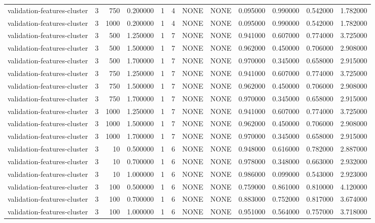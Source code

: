\begin{tabular}{lrrrllllrrrr}
validation-features-cluster & 3 & 750 & 0.200000 & 1 & 4 & NONE & NONE & 0.095000 & 0.990000 & 0.542000 & 1.782000 \\
validation-features-cluster & 3 & 1000 & 0.200000 & 1 & 4 & NONE & NONE & 0.095000 & 0.990000 & 0.542000 & 1.782000 \\
validation-features-cluster & 3 & 500 & 1.250000 & 1 & 7 & NONE & NONE & 0.941000 & 0.607000 & 0.774000 & 3.725000 \\
validation-features-cluster & 3 & 500 & 1.500000 & 1 & 7 & NONE & NONE & 0.962000 & 0.450000 & 0.706000 & 2.908000 \\
validation-features-cluster & 3 & 500 & 1.700000 & 1 & 7 & NONE & NONE & 0.970000 & 0.345000 & 0.658000 & 2.915000 \\
validation-features-cluster & 3 & 750 & 1.250000 & 1 & 7 & NONE & NONE & 0.941000 & 0.607000 & 0.774000 & 3.725000 \\
validation-features-cluster & 3 & 750 & 1.500000 & 1 & 7 & NONE & NONE & 0.962000 & 0.450000 & 0.706000 & 2.908000 \\
validation-features-cluster & 3 & 750 & 1.700000 & 1 & 7 & NONE & NONE & 0.970000 & 0.345000 & 0.658000 & 2.915000 \\
validation-features-cluster & 3 & 1000 & 1.250000 & 1 & 7 & NONE & NONE & 0.941000 & 0.607000 & 0.774000 & 3.725000 \\
validation-features-cluster & 3 & 1000 & 1.500000 & 1 & 7 & NONE & NONE & 0.962000 & 0.450000 & 0.706000 & 2.908000 \\
validation-features-cluster & 3 & 1000 & 1.700000 & 1 & 7 & NONE & NONE & 0.970000 & 0.345000 & 0.658000 & 2.915000 \\
validation-features-cluster & 3 & 10 & 0.500000 & 1 & 6 & NONE & NONE & 0.948000 & 0.616000 & 0.782000 & 2.887000 \\
validation-features-cluster & 3 & 10 & 0.700000 & 1 & 6 & NONE & NONE & 0.978000 & 0.348000 & 0.663000 & 2.932000 \\
validation-features-cluster & 3 & 10 & 1.000000 & 1 & 6 & NONE & NONE & 0.986000 & 0.099000 & 0.543000 & 2.923000 \\
validation-features-cluster & 3 & 100 & 0.500000 & 1 & 6 & NONE & NONE & 0.759000 & 0.861000 & 0.810000 & 4.120000 \\
validation-features-cluster & 3 & 100 & 0.700000 & 1 & 6 & NONE & NONE & 0.883000 & 0.752000 & 0.817000 & 3.674000 \\
validation-features-cluster & 3 & 100 & 1.000000 & 1 & 6 & NONE & NONE & 0.951000 & 0.564000 & 0.757000 & 3.718000 \\

\end{tabular}
